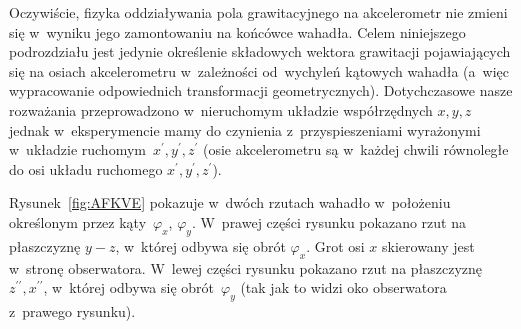 \documentclass[paper=a4,DIV=12]{lpas}
\begin{document}
\begin{appendices}
Oczywiście, fizyka oddziaływania pola grawitacyjnego na akcelerometr nie zmieni
się w~wyniku jego zamontowaniu na końcówce wahadła. Celem niniejszego
podrozdziału jest jedynie określenie składowych wektora grawitacji
pojawiających się na osiach akcelerometru w~zależności od~wychyleń kątowych
wahadła (a~więc wypracowanie odpowiednich transformacji geometrycznych).
Dotychczasowe nasze rozważania przeprowadzono w~nieruchomym układzie
współrzędnych $x,y,z$ jednak w~eksperymencie mamy do czynienia
z~przyspieszeniami wyrażonymi w~układzie
ruchomym~$x^{\prime},y^{\prime},z^{\prime}$ (osie akcelerometru są w~każdej
chwili równoległe do osi układu ruchomego $x^{\prime},y^{\prime},z^{\prime}$).

Rysunek~\ref{fig:AFKVE} pokazuje w~dwóch rzutach wahadło w~położeniu określonym
przez kąty~$\varphi_x$, $\varphi_y$. W~prawej części rysunku pokazano rzut
na płaszczyznę $y-z$, w~której odbywa się obrót $\varphi_x$. Grot osi $x$
skierowany jest w~stronę obserwatora. W~lewej części rysunku pokazano rzut na
płaszczyznę~$z^{\prime\prime}, x^{\prime\prime}$, w~której odbywa się
obrót~$\varphi_y$ (tak jak to widzi oko obserwatora z~prawego rysunku).
\begin{figure}[htbp]
  \centering
\end{figure}
\end{appendices}
\end{document}
